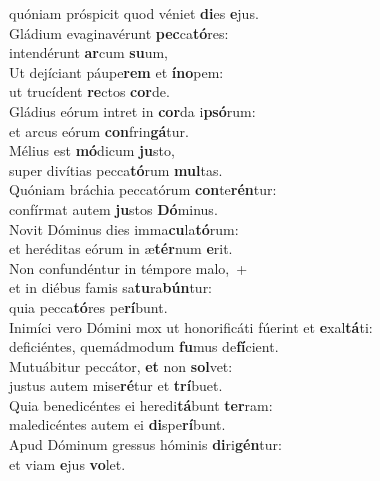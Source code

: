 \oddverse quóniam próspicit quod véniet \textbf{di}es \textbf{e}jus.\\
\evenverse Gládium evaginavérunt \textbf{pec}ca\textbf{tó}res:~\*\\
\evenverse intendérunt \textbf{ar}cum \textbf{su}um,\\
\oddverse Ut dejíciant páupe\textbf{rem} et \textbf{í}\textbf{no}pem:~\*\\
\oddverse ut trucídent \textbf{re}ctos \textbf{cor}de.\\
\evenverse Gládius eórum intret in \textbf{cor}da i\textbf{psó}rum:~\*\\
\evenverse et arcus eórum \textbf{con}frin\textbf{gá}tur.\\
\oddverse Mélius est \textbf{mó}dicum \textbf{ju}sto,~\*\\
\oddverse super divítias pecca\textbf{tó}rum \textbf{mul}tas.\\
\evenverse Quóniam bráchia peccatórum \textbf{con}te\textbf{rén}tur:~\*\\
\evenverse confírmat autem \textbf{ju}stos \textbf{Dó}minus.\\
\oddverse Novit Dóminus dies imma\textbf{cu}la\textbf{tó}rum:~\*\\
\oddverse et heréditas eórum in æ\textbf{tér}num \textbf{e}rit.\\
\evenverse Non confundéntur in témpore malo,~+\\
\evenverse  et in diébus famis sa\textbf{tu}ra\textbf{bún}tur:~\*\\
\evenverse quia pecca\textbf{tó}res pe\textbf{rí}bunt.\\
\oddverse Inimíci vero Dómini mox ut honorificáti fúerint et \textbf{e}xal\textbf{tá}ti:~\*\\
\oddverse deficiéntes, quemádmodum \textbf{fu}mus de\textbf{fí}cient.\\
\evenverse Mutuábitur peccátor, \textbf{et} non \textbf{sol}vet:~\*\\
\evenverse justus autem mise\textbf{ré}tur et \textbf{trí}buet.\\
\oddverse Quia benedicéntes ei heredi\textbf{tá}bunt \textbf{ter}ram:~\*\\
\oddverse maledicéntes autem ei \textbf{di}spe\textbf{rí}bunt.\\
\evenverse Apud Dóminum gressus hóminis \textbf{di}ri\textbf{gén}tur:~\*\\
\evenverse et viam \textbf{e}jus \textbf{vo}let.\\
